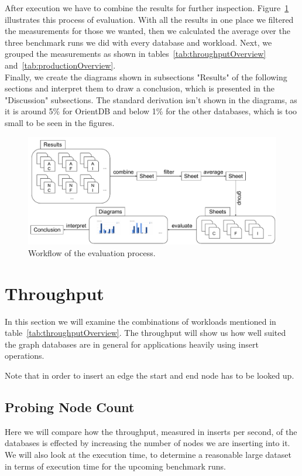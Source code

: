 After execution we have to combine the results for further inspection.
Figure~\ref{fig:evaluationWorkflow} illustrates this process of evaluation.
With all the results in one place we filtered the measurements for those we wanted,
then we calculated the average over the three benchmark runs we did with every database and workload.
Next,
we grouped the measurements as shown in tables~\ref{tab:throughputOverview} and~\ref{tab:productionOverview}.\\

Finally,
we create the diagrams shown in subsections "Results" of the following sections and interpret them to draw a conclusion,
which is presented in the "Discussion" subsections.
The standard derivation isn't shown in the diagrams,
as it is around 5\% for OrientDB and below 1\% for the other databases,
which is too small to be seen in the figures.

\begin{figure}[!h]
  \includegraphics[width=\textwidth]{images/evaluationProcess}
  \caption{Workflow of the evaluation process.}
  \label{fig:evaluationWorkflow}
\end{figure}

\section{Throughput}
\label{ch:evaluation:se:throughput}
In this section we will examine the combinations of workloads mentioned in table~\ref{tab:throughputOverview}.
The throughput will show us how well suited the graph databases are in general for applications heavily using insert operations.

Note that in order to insert an edge the start and end node has to be looked up.

\subsection{Probing Node Count}
\label{ch:evaluation:se:probingNodeCount}
Here we will compare how the throughput,
measured in inserts per second,
of the databases is effected by increasing the number of nodes we are inserting into it.
We will also look at the execution time,
to determine a reasonable large dataset in terms of execution time for the upcoming benchmark runs.

